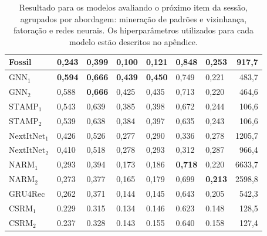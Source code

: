 \begin{table}[htbp]
\begin{tabular}{|l|l|l|l|l|l|l|r|}
    \hline
    Fossil & 0,243 & 0,399 & 0,100 & 0,121 & \textbf{0,848} & 0,253 & 917,7 \\
    \hline
    \hline
    $\text{GNN}_1$ & \textbf{0,594} & \textbf{0,666} & \textbf{0,439} & \textbf{0,450} & 0,749 & 0,221 & 483,7 \\
    \hline
    $\text{GNN}_2$ & 0,588 & \textbf{0,666} & 0,425 & 0,435 & 0,713 & 0,220 & 464,6 \\
    \hline
    $\text{STAMP}_1$ & 0,543 & 0,639 & 0,385 & 0,398 & 0,672 & 0,244 & 106,6 \\
    \hline
    $\text{STAMP}_2$ & 0,539 & 0,638 & 0,384 & 0,397 & 0,635 & 0,243 & 106,6 \\
    \hline  
    $\text{NextItNet}_1$ & 0,426 & 0,526 & 0,277 & 0,290 & 0,336 & 0,278 & 1205,7 \\
    \hline
    $\text{NextItNet}_2$ & 0,410 & 0,518 & 0,278 & 0,293 & 0,312 & 0,287 & 966,4 \\
    \hline
    $\text{NARM}_1$ & 0,293 & 0,394 & 0,173 & 0,186 & \textbf{0,718} & 0,220 & 6633,7 \\
    \hline
    $\text{NARM}_2$ &  0,273 & 0,377 & 0,165 & 0,179 & 0,699 & \textbf{0,213} & 2598,8 \\
    \hline
    $\text{GRU4Rec}$ & 0,262 & 0,371 & 0,144 & 0,145 & 0,643 & 0,205 & 542,3 \\
    \hline
    $\text{CSRM}_1$ & 0.229 & 0.315 & 0.134 & 0.146 & 0.623 & 0.148 &  128,5 \\
    \hline
    $\text{CSRM}_2$ & 0.237 & 0.328 & 0.143 & 0.155 & 0.640 & 0.158 & 127,4 \\
    \hline
  
      \end{tabular}
  \caption{Resultado para os modelos avaliando o próximo item da sessão, agrupados por
  abordagem: mineração de padrões e vizinhança, fatoração e redes neurais.
  Os hiperparâmetros utilizados para cada modelo estão descritos no apêndice.}
  \label{tab_baseline}  
\end{table}

